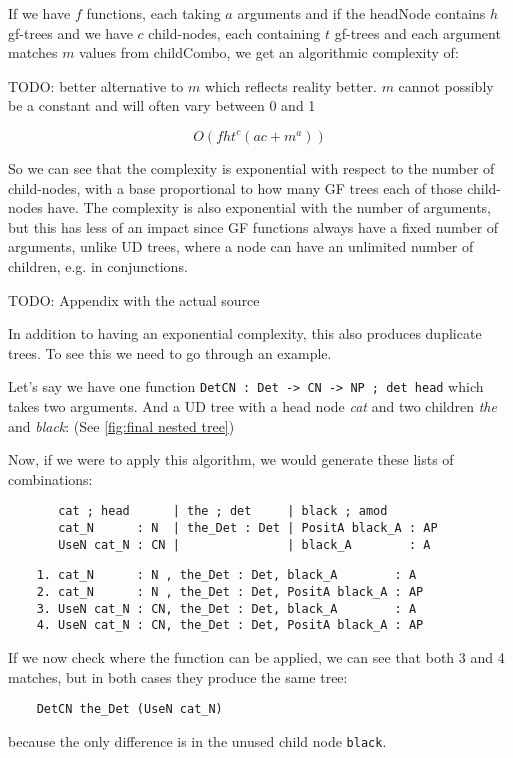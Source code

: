 If we have $f$ functions, each taking $a$ arguments and
if the headNode contains $h$ gf-trees
and we have $c$ child-nodes, each containing $t$ gf-trees
and each argument matches $m$ values from childCombo, we get an algorithmic complexity of:

TODO: better alternative to $m$ which reflects reality better. $m$ cannot possibly be a constant and will often vary between 0 and 1

$$
O(f h t^c (ac+m^a))
$$

So we can see that the complexity is exponential with respect to the number of child-nodes, with a base proportional to how many GF trees each of those child-nodes have. The complexity is also exponential with the number of arguments, but this has less of an impact since GF functions always have a fixed number of arguments, unlike UD trees, where a node can have an unlimited number of children, e.g. in conjunctions.

TODO: Appendix with the actual source

In addition to having an exponential complexity, this also produces duplicate trees. To see this we need to go through an example.

Let's say we have one function \verb|DetCN : Det -> CN -> NP ; det head| which takes two arguments.
And a UD tree with a head node \emph{cat} and two children \emph{the} and \emph{black}: (See \autoref{fig:final nested tree})

Now, if we were to apply this algorithm, we would generate these lists of combinations:
\begin{verbatim}
       cat ; head      | the ; det     | black ; amod
       cat_N      : N  | the_Det : Det | PositA black_A : AP
       UseN cat_N : CN |               | black_A        : A
\end{verbatim}

\begin{verbatim}
    1. cat_N      : N , the_Det : Det, black_A        : A
    2. cat_N      : N , the_Det : Det, PositA black_A : AP
    3. UseN cat_N : CN, the_Det : Det, black_A        : A
    4. UseN cat_N : CN, the_Det : Det, PositA black_A : AP
\end{verbatim}

If we now check where the function can be applied, we can see that both 3 and 4 matches,
but in both cases they produce the same tree:
\begin{verbatim}
    DetCN the_Det (UseN cat_N)
\end{verbatim}
because the only difference is in the unused child node \verb|black|.

